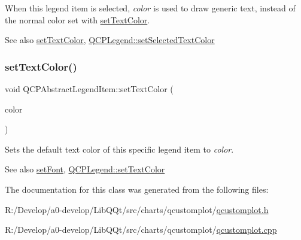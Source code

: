 When this legend item is selected, {\itshape color} is used to draw generic text, instead of the normal color set with \mbox{\hyperlink{class_q_c_p_abstract_legend_item_a6ebace6aaffaedcdab2d74e88acc2d1e}{set\+Text\+Color}}.

\begin{DoxySeeAlso}{See also}
\mbox{\hyperlink{class_q_c_p_abstract_legend_item_a6ebace6aaffaedcdab2d74e88acc2d1e}{set\+Text\+Color}}, \mbox{\hyperlink{class_q_c_p_legend_a7674dfc7a1f30e1abd1018c0ed45e0bc}{Q\+C\+P\+Legend\+::set\+Selected\+Text\+Color}} 
\end{DoxySeeAlso}
\mbox{\label{class_q_c_p_abstract_legend_item_a6ebace6aaffaedcdab2d74e88acc2d1e}} 
\subsubsection{\texorpdfstring{set\+Text\+Color()}{setTextColor()}}
{\footnotesize\ttfamily void Q\+C\+P\+Abstract\+Legend\+Item\+::set\+Text\+Color (\begin{DoxyParamCaption}\item[{const Q\+Color \&}]{color }\end{DoxyParamCaption})}

Sets the default text color of this specific legend item to {\itshape color}.

\begin{DoxySeeAlso}{See also}
\mbox{\hyperlink{class_q_c_p_abstract_legend_item_a409c53455d8112f71d70c0c43eb10265}{set\+Font}}, \mbox{\hyperlink{class_q_c_p_legend_ae1eb239ff4a4632fe1b6c3e668d845c6}{Q\+C\+P\+Legend\+::set\+Text\+Color}} 
\end{DoxySeeAlso}


The documentation for this class was generated from the following files\+:\begin{DoxyCompactItemize}
\item 
R\+:/\+Develop/a0-\/develop/\+Lib\+Q\+Qt/src/charts/qcustomplot/\mbox{\hyperlink{qcustomplot_8h}{qcustomplot.\+h}}\item 
R\+:/\+Develop/a0-\/develop/\+Lib\+Q\+Qt/src/charts/qcustomplot/\mbox{\hyperlink{qcustomplot_8cpp}{qcustomplot.\+cpp}}\end{DoxyCompactItemize}
